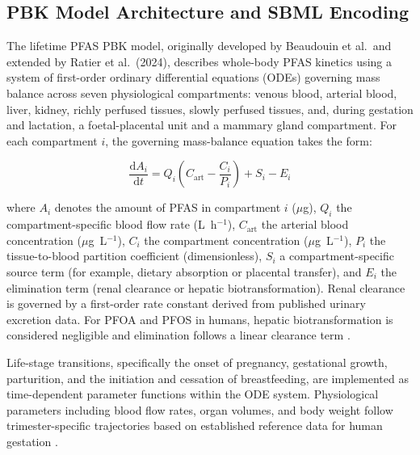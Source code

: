 \documentclass[preprint,12pt]{elsarticle}
\begin{document}
\begin{linenumbers}
\subsection{PBK Model Architecture and SBML Encoding}\label{sec:model}

The lifetime PFAS PBK model, originally developed by Beaudouin et al.\ and extended by Ratier et al.\ (2024), describes whole-body PFAS kinetics using a system of first-order ordinary differential equations (ODEs) governing mass balance across seven physiological compartments: venous blood, arterial blood, liver, kidney, richly perfused tissues, slowly perfused tissues, and, during gestation and lactation, a foetal-placental unit and a mammary gland compartment. For each compartment $i$, the governing mass-balance equation takes the form:

\begin{equation}\label{eq:massbalance}
\frac{\mathrm{d}A_i}{\mathrm{d}t} = Q_i \left( C_{\mathrm{art}} - \frac{C_i}{P_i} \right) + S_i - E_i
\end{equation}

where $A_i$ denotes the amount of PFAS in compartment $i$ ($\mu$g), $Q_i$ the compartment-specific blood flow rate (L~h$^{-1}$), $C_{\mathrm{art}}$ the arterial blood concentration ($\mu$g~L$^{-1}$), $C_i$ the compartment concentration ($\mu$g~L$^{-1}$), $P_i$ the tissue-to-blood partition coefficient (dimensionless), $S_i$ a compartment-specific source term (for example, dietary absorption or placental transfer), and $E_i$ the elimination term (renal clearance or hepatic biotransformation). Renal clearance is governed by a first-order rate constant derived from published urinary excretion data. For PFOA and PFOS in humans, hepatic biotransformation is considered negligible and elimination follows a linear clearance term \citep{loccisano2011,ratier2024}.



Life-stage transitions, specifically the onset of pregnancy, gestational growth, parturition, and the initiation and cessation of breastfeeding, are implemented as time-dependent parameter functions within the ODE system. Physiological parameters including blood flow rates, organ volumes, and body weight follow trimester-specific trajectories based on established reference data for human gestation \citep{beaudouin2010,ratier2024}.


\end{linenumbers}
\end{document}

